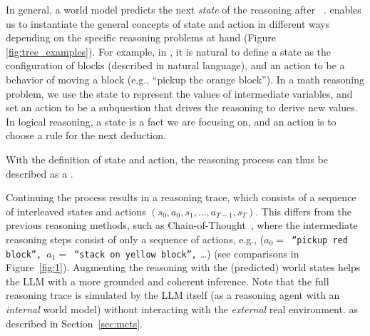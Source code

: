 In general, a world model predicts the next \emph{state} of the reasoning after ~\cite{ha2018world, matsuo2022deep}. \ours enables us to instantiate the general concepts of state and action in different ways depending on the specific reasoning problems at hand (Figure \ref{fig:tree_examples}). For example, in \blocksworld, it is natural to define a state as the configuration of blocks (described in natural language), and an action to be a behavior of moving a block (e.g., ``pickup the orange block''). In a math reasoning problem, we use the state to represent the values of intermediate variables, and set an action to be a subquestion that drives the reasoning to derive new values. In logical reasoning, a state is a fact we are focusing on, and an action is to choose a rule for the next deduction.


With the definition of state and action, the reasoning process can thus be described as a .

Continuing the process results in a reasoning trace, which consists of a sequence of interleaved states and actions $(s_0, a_0, s_1, \dots, a_{T-1}, s_T)$. This differs from the previous reasoning methods, such as Chain-of-Thought~\cite{wei2022chain}, where the intermediate reasoning steps consist of only a sequence of actions, e.g., (\texttt{$a_0=$ ``pickup red block'', $a_1=$ ``stack on yellow block'',} \dots) (see comparisons in Figure~\ref{fig:1}). Augmenting the reasoning with the (predicted) world states helps the LLM with a more grounded and coherent inference. Note that the full reasoning trace is simulated by the LLM itself (as a reasoning agent with an \emph{internal} world model) without interacting with the \emph{external} real environment.  as described in Section~\ref{sec:mcts}.


